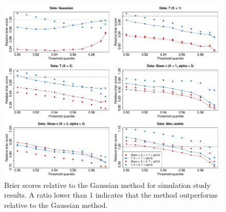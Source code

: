\documentclass[11pt]{article}
\begin{document}
\begin{figure}
  \includegraphics[width=\linewidth]{plots/bsplots-mean.pdf}
  \caption{Brier scores relative to the Gaussian method for simulation study results. A ratio lower than 1 indicates that the method outperforms relative to the Gaussian method.}
  \label{fig:simbrierscores}
\end{figure}
\end{document}
